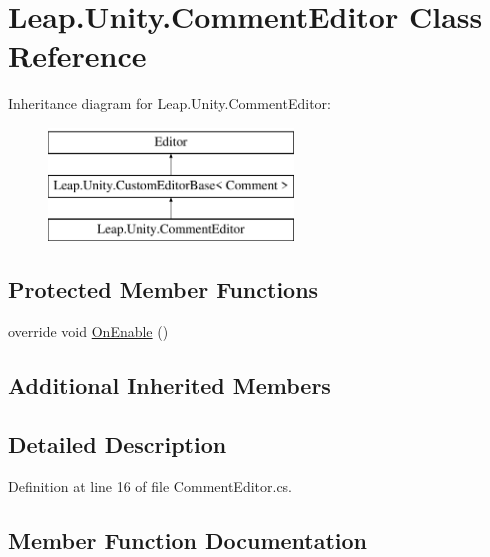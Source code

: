 \hypertarget{class_leap_1_1_unity_1_1_comment_editor}{}\section{Leap.\+Unity.\+Comment\+Editor Class Reference}
\label{class_leap_1_1_unity_1_1_comment_editor}
Inheritance diagram for Leap.\+Unity.\+Comment\+Editor\+:\begin{figure}[H]
\begin{center}
\leavevmode
\includegraphics[height=3.000000cm]{class_leap_1_1_unity_1_1_comment_editor}
\end{center}
\end{figure}
\subsection*{Protected Member Functions}
\begin{DoxyCompactItemize}
\item 
override void \mbox{\hyperlink{class_leap_1_1_unity_1_1_comment_editor_a791bd306d98e332059fb4936256e5bac}{On\+Enable}} ()
\end{DoxyCompactItemize}
\subsection*{Additional Inherited Members}


\subsection{Detailed Description}


Definition at line 16 of file Comment\+Editor.\+cs.



\subsection{Member Function Documentation}
\mbox{\label{class_leap_1_1_unity_1_1_comment_editor_a791bd306d98e332059fb4936256e5bac}} 
